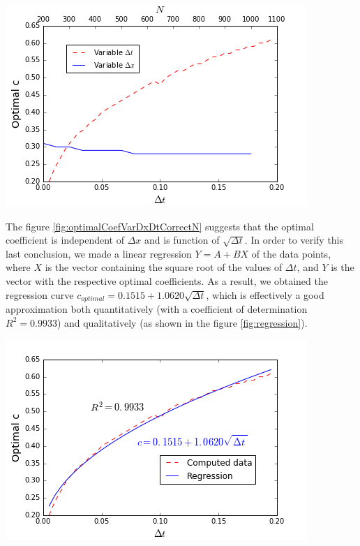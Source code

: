 \begin{center}
	\includegraphics[scale=.5]{figures/OptimalCoefVarDxDtCorrectN.png}
\end{center}

\indent The figure \ref{fig:optimalCoefVarDxDtCorrectN} suggests that the optimal coefficient is independent of $\Delta x$ and is function of $\sqrt{\Delta t}$. In order to verify this last conclusion, we made a linear regression $Y = A + BX$ of the data points, where $X$ is the vector containing the square root of the values of $\Delta t$, and $Y$ is the vector with the respective optimal coefficients. As a result, we obtained the regression curve $c_{optimal} = 0.1515 + 1.0620\sqrt{\Delta t}$, which is effectively a good approximation both quantitatively (with a coefficient of determination $R^2 = 0.9933$) and qualitatively (as shown in the figure \ref{fig:regression}).

\begin{center}
	\includegraphics[scale=.5]{figures/regression.png}
\end{center}

